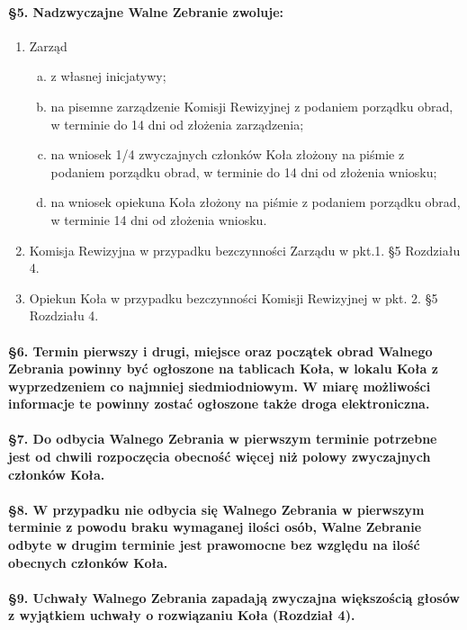 \documentclass{article}
\begin{document}
		\paragraph{\S 5. Nadzwyczajne Walne Zebranie zwoluje:}
		\begin{enumerate}
			\item Zarząd
		\begin{enumerate}[(a)]
			\item z własnej inicjatywy;
			\item na pisemne zarządzenie Komisji Rewizyjnej z podaniem porządku obrad, w terminie do 14 dni od złożenia zarządzenia;
			\item na wniosek 1/4 zwyczajnych członków Koła złożony na piśmie z podaniem porządku obrad, w terminie do 14 dni od złożenia wniosku;
			\item na wniosek opiekuna Koła złożony na piśmie z podaniem porządku obrad, w terminie 14 dni od złożenia wniosku.
		\end{enumerate}
			\item Komisja Rewizyjna w przypadku bezczynności Zarządu w pkt.1. §5 Rozdziału 4.
			\item Opiekun Koła w przypadku bezczynności Komisji Rewizyjnej w pkt. 2. §5 Rozdziału 4.
		\end{enumerate}
		\paragraph{\S 6. Termin pierwszy i drugi, miejsce oraz początek obrad Walnego Zebrania powinny być ogłoszone na tablicach Koła,
                           w lokalu Koła z wyprzedzeniem co najmniej siedmiodniowym. W miarę możliwości informacje te powinny zostać ogłoszone także droga elektroniczna.}
		\paragraph{\S 7. Do odbycia Walnego Zebrania w pierwszym terminie potrzebne jest od chwili rozpoczęcia obecność więcej niż polowy zwyczajnych członków Koła.}
		\paragraph{\S 8. W przypadku nie odbycia się Walnego Zebrania w pierwszym terminie z powodu braku wymaganej ilości osób,
                           Walne Zebranie odbyte w drugim terminie jest prawomocne bez względu na ilość obecnych członków Koła.}
		\paragraph{\S 9. Uchwały Walnego Zebrania zapadają zwyczajna większością głosów z wyjątkiem uchwały o rozwiązaniu Koła (Rozdział 4).}
\end{document}

